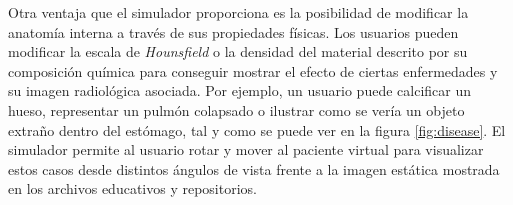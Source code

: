 Otra ventaja que el simulador proporciona es la posibilidad de modificar la anatomía interna a través de sus propiedades físicas. Los usuarios pueden modificar la escala de \emph{Hounsfield} o la densidad del material descrito por su composición química para conseguir mostrar el efecto de ciertas enfermedades y su imagen radiológica asociada. Por ejemplo, un usuario puede calcificar un hueso, representar un pulmón colapsado o ilustrar como se vería un objeto extraño dentro del estómago, tal y como se puede ver en la figura \ref{fig:disease}. El simulador permite al usuario rotar y mover al paciente virtual para visualizar estos casos desde distintos ángulos de vista frente a la imagen estática mostrada en los archivos educativos y repositorios.%



